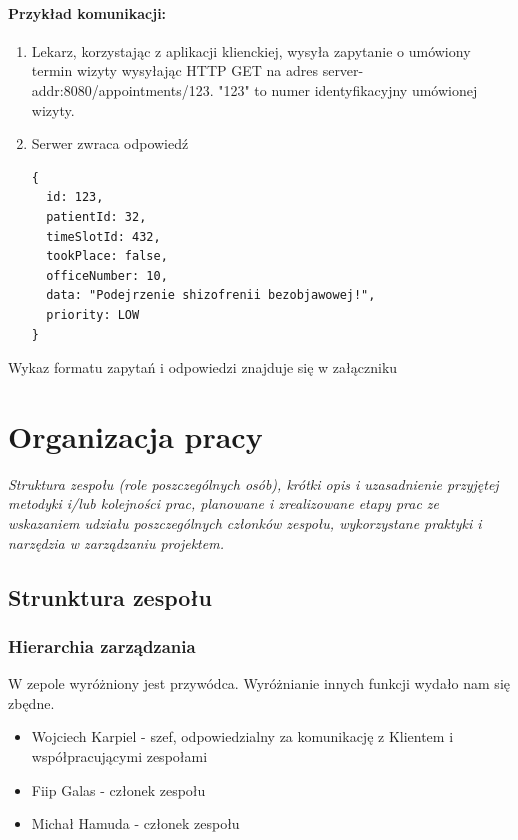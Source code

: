 \documentclass[polish,12pt]{aghthesis}
\begin{document}
\paragraph{Przykład komunikacji:}{
\begin{enumerate}
  \item Lekarz, korzystając z aplikacji klienckiej, wysyła zapytanie o umówiony termin wizyty wysyłając HTTP GET na adres server-addr:8080/appointments/123. "123" to numer identyfikacyjny umówionej wizyty.
  \item Serwer zwraca odpowiedź
\begin{verbatim}
{    
  id: 123,
  patientId: 32,
  timeSlotId: 432,
  tookPlace: false,
  officeNumber: 10,
  data: "Podejrzenie shizofrenii bezobjawowej!",
  priority: LOW
}
\end{verbatim}
\end{enumerate}


Wykaz formatu zapytań i odpowiedzi znajduje się w załączniku
}

\section{Organizacja pracy}
\label{sec:organizacja-pracy}

\emph{Struktura zespołu (role poszczególnych osób), krótki opis i
  uzasadnienie przyjętej metodyki i/lub kolejności prac, planowane i
  zrealizowane etapy prac ze wskazaniem udziału poszczególnych
  członków zespołu, wykorzystane praktyki i narzędzia w zarządzaniu
  projektem.}
  
\subsection{Strunktura zespołu}
\subsubsection{Hierarchia zarządzania}
W zepole wyróżniony jest przywódca. Wyróżnianie innych funkcji wydało nam się zbędne.
\begin{itemize}
    \item Wojciech Karpiel - szef, odpowiedzialny za komunikację z Klientem i współpracującymi zespołami
    \item Fiip Galas - członek zespołu
    \item Michał Hamuda - członek zespołu
\end{itemize}
\end{document}
